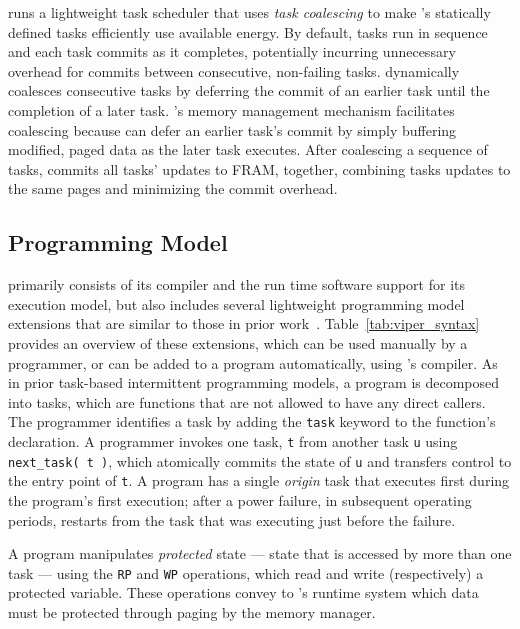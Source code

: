 \sys runs a lightweight task scheduler that uses {\em task coalescing} to make
\sys's statically defined tasks efficiently use available energy.  By default,
tasks run in sequence and each task commits as it completes, potentially
incurring unnecessary overhead for commits between consecutive, non-failing
tasks.  \sys dynamically coalesces consecutive tasks by deferring the commit of
an earlier task until the completion of a later task.  \sys's memory management
mechanism facilitates coalescing because \sys can defer an earlier task's
commit by simply buffering modified, paged data as the later task executes.
After coalescing a sequence of tasks, \sys commits all tasks' updates to FRAM,
together, combining tasks updates to the same pages and minimizing the commit
overhead.


\subsection{Programming Model}
\label{sec:overview_programming_model}

\sys primarily consists of its compiler and the run time software support for
its execution model, but \sys also includes several lightweight programming
model extensions that are similar to those in prior work~\cite{chain,alpaca}.
Table~\ref{tab:viper_syntax} provides an overview of these extensions, which
can be used manually by a programmer, or can be added to a program
automatically, using \sys's compiler.  As in prior task-based intermittent
programming models, a \sys program is decomposed into tasks, which are
functions that are not allowed to have any direct callers.  The programmer
identifies a task by adding the {\tt task} keyword to the function's
declaration.  A programmer invokes one task, {\tt t} from another task {\tt u}
using {\tt next\_task( t )}, which atomically commits the state of {\tt u} and
transfers control to the entry point of {\tt t}.   A program has a single {\em
origin} task that executes first during the program's first execution; after a
power failure, in subsequent operating periods, \sys restarts from the task
that was executing just before the failure.

A \sys program manipulates {\em protected} state --- state that is accessed by
more than one task --- using the {\tt RP} and {\tt WP} operations, which read
and write (respectively) a protected variable. These operations convey to
\sys's runtime system which data must be protected through paging by the memory
manager.   

